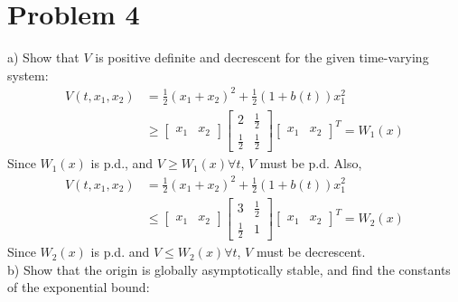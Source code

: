 \documentclass[paper=a4, fontsize=11pt]{scrartcl} %
\numberwithin{equation}{section} %
\numberwithin{figure}{section} %
\numberwithin{table}{section} %
\begin{document}
\section{Problem 4}
a) Show that $V$ is positive definite and decrescent for the given time-varying system:
\begin{align}
V(t, x_1, x_2) &= \frac{1}{2}(x_1+x_2)^2+\frac{1}{2}(1+b(t))x_1^2 \\
&\geq \begin{bmatrix}x_1 & x_2\end{bmatrix} \begin{bmatrix}2 & \frac{1}{2}\\ \frac{1}{2} & \frac{1}{2}\end{bmatrix} \begin{bmatrix}x_1 & x_2\end{bmatrix}^T = W_1(x)
\end{align}
Since $W_1(x)$ is p.d., and $V \geq W_1(x) \forall t$, $V$ must be p.d. Also, 
\begin{align}
 V(t, x_1, x_2) &= \frac{1}{2}(x_1+x_2)^2+\frac{1}{2}(1+b(t))x_1^2 \\
&\leq \begin{bmatrix}x_1 & x_2\end{bmatrix} \begin{bmatrix}3 & \frac{1}{2}\\ \frac{1}{2} & 1\end{bmatrix} \begin{bmatrix}x_1 & x_2\end{bmatrix}^T = W_2(x)
\end{align}
Since $W_2(x)$ is p.d. and $V \leq W_2(x) \forall t$, $V$ must be decrescent. \\

b) Show that the origin is globally asymptotically stable, and find the constants of the exponential bound:
\end{document}
